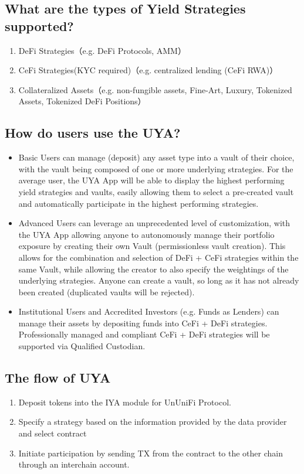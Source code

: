 \documentclass[dvipdfmx]{jsarticle}
\begin{document}
\subsection{What are the types of Yield Strategies supported?}
\begin{enumerate}
  \item DeFi Strategies（e.g. DeFi Protocols, AMM）
  \item CeFi Strategies(KYC required)（e.g. centralized lending (CeFi RWA)）
  \item Collateralized Assets（e.g. non-fungible assets, Fine-Art, Luxury, Tokenized Assets, Tokenized DeFi Positions）
\end{enumerate}

\subsection{How do users use the UYA?}
\begin{itemize}
  \item Basic Users can manage (deposit) any asset type into a vault of their choice, with the vault being composed of one or more underlying strategies. For the average user, the UYA App will be able to display the highest performing yield strategies and vaults, easily allowing them to select a pre-created vault and automatically participate in the highest performing strategies.
  \item Advanced Users can leverage an unprecedented level of customization, with the UYA App allowing anyone to autonomously manage their portfolio exposure by creating their own Vault (permissionless vault creation). This allows for the combination and selection of DeFi + CeFi strategies within the same Vault, while allowing the creator to also specify the weightings of the underlying strategies. Anyone can create a vault, so long as it has not already been created (duplicated vaults will be rejected).
  \item Institutional Users and Accredited Investors (e.g. Funds as Lenders) can manage their assets by depositing funds into CeFi + DeFi strategies. Professionally managed and compliant CeFi + DeFi strategies will be supported via Qualified Custodian.
\end{itemize}

\subsection{The flow of UYA}
\begin{enumerate}
  \item Deposit tokens into the IYA module for UnUniFi Protocol.
  \item Specify a strategy based on the information provided by the data provider and select contract
  \item Initiate participation by sending TX from the contract to the other chain through an interchain account.
\end{enumerate}
\end{document}
